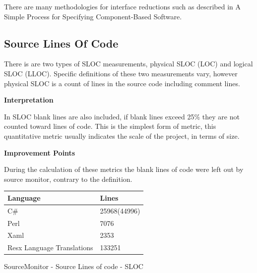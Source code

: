		\vspace{-4mm}
		\normalsize
		{				
			There are many methodologies for interface reductions such as described in A Simple Process for Specifying Component-Based Software. \citet{CheesmanDaniels}
			\newline
		}	
		

	\subsection{Source Lines Of Code}

		\normalsize
		{
			There is are two types of SLOC measurements, physical SLOC (LOC) and logical SLOC (LLOC). 
			Specific definitions of these two measurements vary, however physical SLOC is a count of lines in the source code including comment lines.  				
			\newline
		}

		\large{\bfseries{Interpretation}}
		\vspace{2mm}
		
		\normalsize
		{
			In SLOC blank lines are also included, if blank lines exceed 25\% they are not counted toward lines of code.
			This is the simplest form of metric, this quantitative metric usually indicates the 
			scale of the project, in terms of size. 
			\newline
		}			

			
		\vspace{-7mm}
		\begin{multicols}{2}	

			\large{\bfseries{Improvement Points}}
			\vspace{2mm}
			
			\normalsize
			{
				During the calculation of these metrics the blank lines of code were left out by source monitor, contrary to the definition.  
			}			
			
			\begin{tablehere}
				\centering
				\small
				{					
					\vspace{30mm}
					\begin{tabular}{ | l | l |}
																		   \hline
						Language 					& Lines 			\\ \hline
						C\# 						& 25968(44996)		\\ \hline
						Perl 						& 7076				\\ \hline
						Xaml 						& 2353				\\ \hline
						Resx Language Translations  & 133251			\\ \hline
					\end{tabular}
				}
				\caption{SourceMonitor - Source Lines of code - SLOC}
				\label{tab:SourceMonitorLinesofcode}
			\end{tablehere}
		
		\end{multicols}
		
